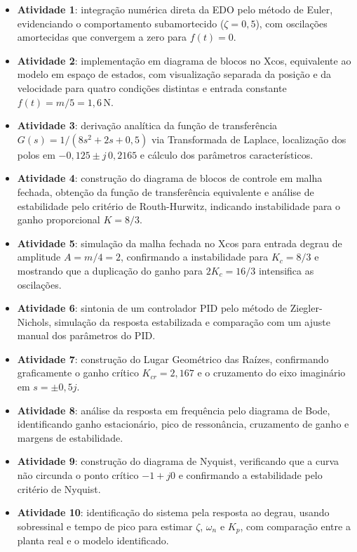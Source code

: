 \documentclass[12pt,a4paper]{article}
\begin{document}
\begin{itemize}
  \item \textbf{Atividade 1}: integração numérica direta da EDO pelo método de Euler, evidenciando o comportamento subamortecido ($\zeta=0{,}5$), com oscilações amortecidas que convergem a zero para $f(t)=0$.
  \item \textbf{Atividade 2}: implementação em diagrama de blocos no Xcos, equivalente ao modelo em espaço de estados, com visualização separada da posição e da velocidade para quatro condições distintas e entrada constante $f(t)=m/5=1{,}6$\,N.
  \item \textbf{Atividade 3}: derivação analítica da função de transferência $G(s)=1/(8s^2+2s+0{,}5)$ via Transformada de Laplace, localização dos polos em $-0{,}125\pm j\,0{,}2165$ e cálculo dos parâmetros característicos.
  \item \textbf{Atividade 4}: construção do diagrama de blocos de controle em malha fechada, obtenção da função de transferência equivalente e análise de estabilidade pelo critério de Routh-Hurwitz, indicando instabilidade para o ganho proporcional $K=8/3$.
  \item \textbf{Atividade 5}: simulação da malha fechada no Xcos para entrada degrau de amplitude $A=m/4=2$, confirmando a instabilidade para $K_c=8/3$ e mostrando que a duplicação do ganho para $2K_c=16/3$ intensifica as oscilações.
  \item \textbf{Atividade 6}: sintonia de um controlador PID pelo método de Ziegler-Nichols, simulação da resposta estabilizada e comparação com um ajuste manual dos parâmetros do PID.
  \item \textbf{Atividade 7}: construção do Lugar Geométrico das Raízes, confirmando graficamente o ganho crítico $K_{cr}=2{,}167$ e o cruzamento do eixo imaginário em $s=\pm0{,}5j$.
  \item \textbf{Atividade 8}: análise da resposta em frequência pelo diagrama de Bode, identificando ganho estacionário, pico de ressonância, cruzamento de ganho e margens de estabilidade.
  \item \textbf{Atividade 9}: construção do diagrama de Nyquist, verificando que a curva não circunda o ponto crítico $-1+j0$ e confirmando a estabilidade pelo critério de Nyquist.
  \item \textbf{Atividade 10}: identificação do sistema pela resposta ao degrau, usando sobressinal e tempo de pico para estimar $\zeta$, $\omega_n$ e $K_p$, com comparação entre a planta real e o modelo identificado.
\end{itemize}
\end{document}
